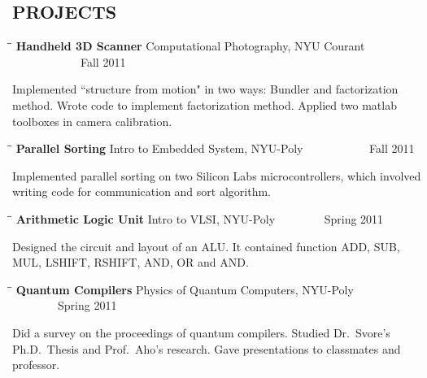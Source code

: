 \documentclass{res}
\begin{document}
\begin{resume}
\section{PROJECTS}
   \vspace{-0.05in}	
  \begin{tabbing}
   \hspace{2.3in}\= \hspace{2.6in}\= \kill %
    {\bf Handheld 3D Scanner} \>Computational Photography, NYU Courant\> ~~~~~~~~~~~~Fall 2011\\
   \end{tabbing}\vspace{-20pt}
    Implemented ``structure from motion" in two ways: Bundler and factorization method. Wrote code to implement factorization method. Applied two matlab toolboxes in camera calibration. \\
       \begin{tabbing}
   \hspace{2.3in}\= \hspace{2.6in}\= \kill %
    {\bf Parallel Sorting} \>Intro to Embedded System, NYU-Poly     \>~~~~~~~~~~~Fall 2011 \\
     \end{tabbing}\vspace{-20pt}      %
     Implemented parallel sorting on two Silicon Labs microcontrollers, which involved writing code for communication and sort algorithm.
   \begin{tabbing}%
   \hspace{2.3in}\= \hspace{2.6in}\= \kill %
   {\bf Arithmetic Logic Unit}  \>Intro to VLSI, NYU-Poly\> ~~~~~~~~Spring 2011\\
   \end{tabbing}\vspace{-20pt}
    Designed the circuit and layout of an ALU. It contained function ADD, SUB, MUL, LSHIFT, RSHIFT, AND, OR and AND.
      \begin{tabbing}%
   \hspace{2.3in}\= \hspace{2.6in}\= \kill %
   {\bf Quantum Compilers}  \>Physics of Quantum Computers, NYU-Poly\> ~~~~~~~~Spring 2011\\
   \end{tabbing}\vspace{-20pt}
    Did a survey on the proceedings of quantum compilers. Studied Dr.\ Svore's Ph.D.\ Thesis and Prof.\ Aho's research. Gave presentations to classmates and  professor.

\end{resume}
\end{document}
